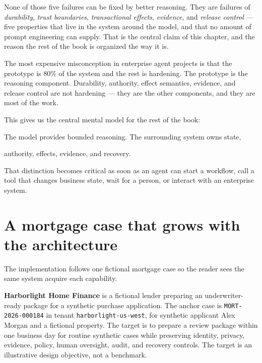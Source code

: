 None of those five failures can be fixed by better reasoning. They are failures of \emph{durability}, \emph{trust boundaries}, \emph{transactional effects}, \emph{evidence}, and \emph{release control} — five properties that live in the system around the model, and that no amount of prompt engineering can supply. That is the central claim of this chapter, and the reason the rest of the book is organized the way it is.\par

\begin{bookantipattern}
The most expensive misconception in enterprise agent projects is that the prototype is 80\% of the system and the rest is hardening. The prototype is the reasoning component. Durability, authority, effect semantics, evidence, and release control are not hardening — they are the other components, and they are most of the work.
\end{bookantipattern}

This gives us the central mental model for the rest of the book:\par

\begin{bookquote}

The model provides bounded reasoning. The surrounding system owns state,

\end{bookquote}

\begin{bookquote}

authority, effects, evidence, and recovery.

\end{bookquote}

That distinction becomes critical as soon as an agent can start a workflow, call a tool that changes business state, wait for a person, or interact with an enterprise system.\par

\section{A mortgage case that grows with the architecture}

The implementation follows one fictional mortgage case so the reader sees the same system acquire each capability.\par

\textbf{Harborlight Home Finance} is a fictional lender preparing an underwriter-ready package for a synthetic purchase application. The anchor case is \lstinline[style=bookinline]!MORT-2026-000184! in tenant \lstinline[style=bookinline]!harborlight-us-west!, for synthetic applicant Alex Morgan and a fictional property. The target is to prepare a review package within one business day for routine synthetic cases while preserving identity, privacy, evidence, policy, human oversight, audit, and recovery controls. The target is an illustrative design objective, not a benchmark.\par

